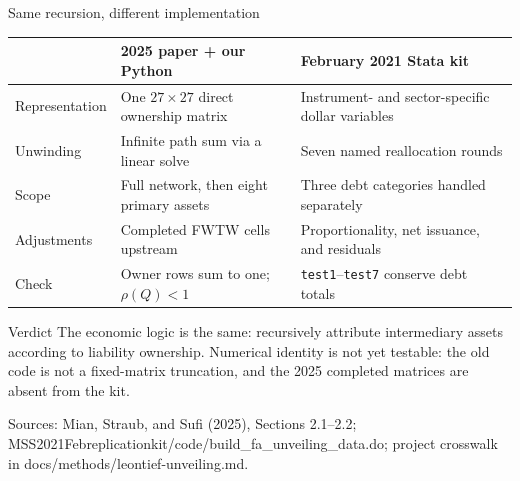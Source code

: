 \documentclass[aspectratio=169,11pt]{beamer}
\newcommand{\source}[1]{%
  \vfill
  {\color{MSSGray}\fontsize{6.5}{7.5}\selectfont #1\par}
}
\begin{document}
\begin{frame}{Same recursion, different implementation}
  \centering
  \fontsize{8.6}{10.2}\selectfont
  \begin{tabular}{@{}>{\raggedright\arraybackslash}p{2.35cm}
    >{\raggedright\arraybackslash}p{5.35cm}
    >{\raggedright\arraybackslash}p{5.35cm}@{}}
    \toprule
    & \textbf{2025 paper + our Python} & \textbf{February 2021 Stata kit}\\
    \midrule
    Representation
      & One \(27\times27\) direct ownership matrix
      & Instrument- and sector-specific dollar variables\\[0.08cm]
    Unwinding
      & Infinite path sum via a linear solve
      & Seven named reallocation rounds\\[0.08cm]
    Scope
      & Full network, then eight primary assets
      & Three debt categories handled separately\\[0.08cm]
    Adjustments
      & Completed FWTW cells upstream
      & Proportionality, net issuance, and residuals\\[0.08cm]
    Check
      & Owner rows sum to one; \(\rho(Q)<1\)
      & \texttt{test1}--\texttt{test7} conserve debt totals\\
    \bottomrule
  \end{tabular}
  \vspace{0.18cm}

  \begin{alertblock}{Verdict}
    \fontsize{8.6}{10.2}\selectfont
    The economic logic is the same: recursively attribute intermediary assets
    according to liability ownership. Numerical identity is not yet testable:
    the old code is not a fixed-matrix truncation, and the 2025 completed
    matrices are absent from the kit.
  \end{alertblock}
  \source{Sources: Mian, Straub, and Sufi (2025), Sections 2.1--2.2; MSS2021Febreplicationkit/code/build\_fa\_unveiling\_data.do; project crosswalk in docs/methods/leontief-unveiling.md.}
\end{frame}
\end{document}
